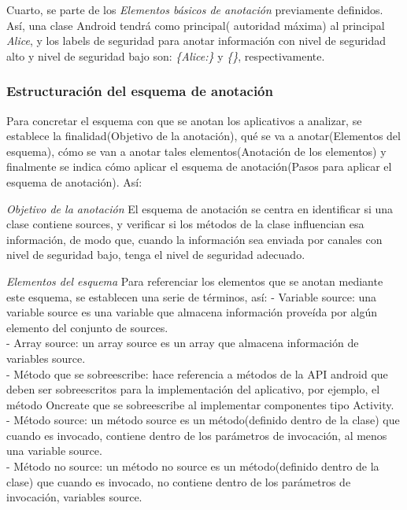 Cuarto, se parte de los \textit{Elementos básicos de anotación} previamente
definidos. Así, una clase Android tendrá como principal( autoridad máxima) al
principal \emph{Alice}, y los labels de seguridad para anotar información con
nivel de seguridad alto y nivel de seguridad bajo son: \emph{\{Alice:\}} y
\emph{\{\}}, respectivamente.

\subsubsection{Estructuración del esquema de anotación}
Para concretar el esquema con que se anotan los aplicativos a analizar, se
establece la finalidad(Objetivo de la anotación), qué se va a anotar(Elementos
del esquema), cómo se van a anotar tales elementos(Anotación de los elementos) y
finalmente se indica cómo aplicar el esquema de anotación(Pasos para aplicar el
esquema de anotación). Así:

\textit{Objetivo de la anotación}\newline
El esquema de anotación se centra en identificar si una clase contiene sources,
y verificar si los métodos de la clase influencian esa información, de modo que,
cuando la información sea enviada por canales con nivel de seguridad bajo, tenga
el nivel de seguridad adecuado.

\textit{Elementos del esquema}\newline
Para referenciar los elementos que se anotan mediante este esquema, se
establecen una serie de términos, así:\newline
- Variable source: una variable source es una variable que almacena
información proveída por algún elemento del conjunto de sources.\\
- Array source: un array source es un array que almacena información de
variables source.\\
- Método que se sobreescribe: hace referencia a métodos de la API android
que deben ser sobreescritos para la implementación del aplicativo, por ejemplo, el
método Oncreate que se sobreescribe al implementar componentes tipo
Activity.\\
- Método source: un método source es un método(definido dentro de la
clase) que cuando es invocado, contiene dentro de los parámetros de invocación, al menos
una variable source.\\
- Método no source: un método no source es un método(definido dentro de la
clase) que cuando es invocado, no contiene dentro de los parámetros de invocación,
variables source.

